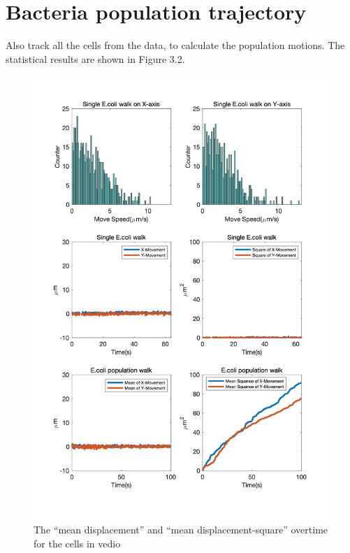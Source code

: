 \section{Bacteria population trajectory}
Also track all the cells from the data, to calculate the population motions. The statistical results are shown in Figure 3.2.
\begin{figure}[H]
\centering
\includegraphics[width=0.75\linewidth]{Figures/P3_fig2.png}
\caption{The ``mean displacement'' and ``mean displacement-square'' overtime for the cells in vedio}
\label{P2_fig2}
\end{figure}

